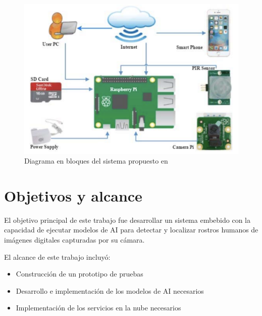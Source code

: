 \begin{figure}[h]
	\centering
	\includegraphics[scale=0.4]{./Figures/soa_arch.png}
	\caption{Diagrama en bloques del sistema propuesto en \cite{soa_ref}}
	\label{fig:soa_arch}
\end{figure}

\section{Objetivos y alcance}
El objetivo principal de este trabajo fue desarrollar un sistema embebido con la capacidad de ejecutar modelos de AI para detectar y localizar rostros humanos de imágenes digitales capturadas por su cámara.

El alcance de este trabajo incluyó:
\begin{itemize}
	\item Construcción de un prototipo de pruebas
	\item Desarrollo e implementación de los modelos de AI necesarios
	\item Implementación de los servicios en la nube necesarios
\end{itemize}
